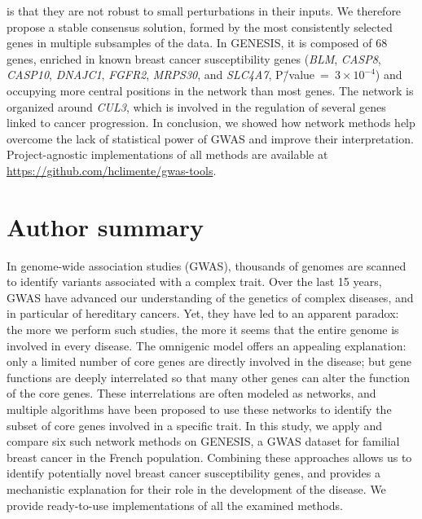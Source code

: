 \documentclass[10pt,letterpaper]{article}
\begin{document}
is that they are not robust to small perturbations in their inputs. %
We therefore propose a stable consensus solution, formed by the most consistently selected genes in multiple subsamples of the data. In GENESIS, it is composed of 68 genes, enriched in known breast cancer susceptibility genes (\emph{BLM}, \emph{CASP8}, \emph{CASP10}, \emph{DNAJC1}, \emph{FGFR2}, \emph{MRPS30}, and \emph{SLC4A7}, P\=/value~=~$3 \times 10^{-4}$) and occupying more central positions in the network than most genes. The network is organized around \emph{CUL3}, which is involved in the regulation of several genes linked to cancer progression. In conclusion, we showed how network methods help overcome the lack of statistical power of GWAS and improve their interpretation. Project-agnostic implementations of all methods are available at \url{https://github.com/hclimente/gwas-tools}. %

\section*{Author summary}
In genome-wide association studies (GWAS), thousands of genomes are scanned to identify variants associated with a complex trait. Over the last 15 years, GWAS have advanced our understanding of the genetics of complex diseases, and in particular of hereditary cancers. Yet, they have led to an apparent paradox: the more we perform such studies, the more it seems that the entire genome is involved in every disease. The omnigenic model offers an appealing explanation: only a limited number of core genes are directly involved in the disease; but gene functions are deeply interrelated so that many other genes can alter the function of the core genes. These interrelations are often modeled as networks, and multiple algorithms have been proposed to use these networks to identify the subset of core genes involved in a specific trait. In this study, we apply and compare six such network methods on GENESIS, a GWAS dataset for familial breast cancer in the French population. Combining these approaches allows us to identify potentially novel breast cancer susceptibility genes, and provides a mechanistic explanation for their role in the development of the disease. We provide ready-to-use implementations of all the examined methods.
\linenumbers
\end{document}
